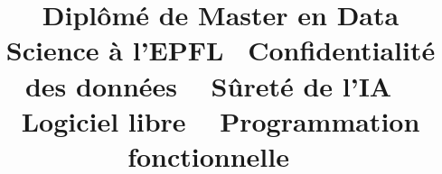\title{
  Diplômé de Master en Data Science à l'EPFL
  \newline
  \newline
  \normalsize{
    ~Confidentialité des données%
    ~ Sûreté de l'IA%
    ~ Logiciel libre%
    ~ Programmation fonctionnelle%
    ~
  }
}
